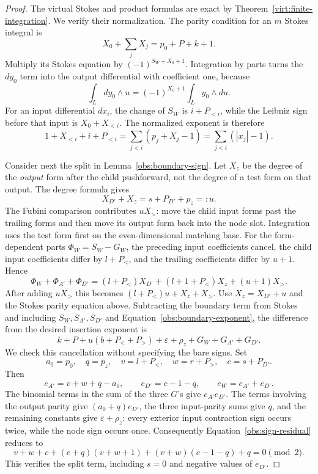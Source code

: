 \documentclass[11pt]{article}
\theoremstyle{definition}
\theoremstyle{remark}
\numberwithin{equation}{section}
\begin{document}
\begin{proof}
The virtual Stokes and product formulas are exact by
Theorem~\ref{virt:finite-integration}.  We verify their normalization.
The parity condition for an $m$ Stokes integral is
\[
 X_0+\sum_jX_j=p_0+P+k+1.
\]
Multiply its Stokes equation by $(-1)^{S_W+X_0+1}$.
Integration by parts turns the $dy_0$ term into the output
differential with coefficient one, because
\[
 \int_Ldy_0\wedge u=(-1)^{X_0+1}\int_Ly_0\wedge du.
\]
For an input differential $dx_i$, the change of $S_W$ is
$i+P_{<i}$, while the Leibniz sign before that input is
$X_0+X_{<i}$.  The normalized exponent is therefore
\[
 1+X_{<i}+i+P_{<i}
 =\sum_{j<i}(p_j+X_j-1)
 =\sum_{j<i}(|x_j|-1).
\]

Consider next the split in Lemma~\ref{obs:boundary-sign}.  Let
$X_z$ be the degree of the \emph{output} form after the child
pushforward, not the degree of a test form on that output.  The
degree formula gives
\[
 X_{D'}+X_z=s+P_{D'}+p_z=:u.
\]
The Fubini comparison contributes $uX_>$: move the child input
forms past the trailing forms and then move its output form back
into the node slot.  Integration uses the test form first on the
even-dimensional matching base.  For the form-dependent parts
$\Phi_W=S_W-G_W$, the preceding input coefficients cancel,
the child input coefficients differ by $l+P_<$, and the
trailing coefficients differ by $u+1$.  Hence
\[
 \Phi_W+\Phi_{A'}+\Phi_{D'}
 =(l+P_<)X_{D'}+(l+1+P_<)X_z+(u+1)X_>.
\]
After adding $uX_>$ this becomes
$(l+P_<)u+X_z+X_>$.  Use
$X_z=X_{D'}+u$ and the Stokes parity equation above.
Subtracting the boundary term
from Stokes and including $S_W,S_{A'},S_{D'}$ and
Equation~\eqref{obs:boundary-exponent}, the difference from the
desired insertion exponent is
\begin{equation}
 \label{obs:sign-residual}
 k+P+u(b+P_<+P_>)+\varepsilon+\rho_z
          +G_W+G_{A'}+G_{D'}.
\end{equation}
We check this cancellation without specifying the bare signs.
Set
\[
 a_0=p_0,\quad q=p_z,\quad
 v=l+P_<,\quad w=r+P_>,\quad c=s+P_{D'}.
\]
Then
\[
 e_{A'}=v+w+q-a_0,\qquad e_{D'}=c-1-q,
 \qquad e_W=e_{A'}+e_{D'}.
\]
The binomial terms in the sum of the three $G$'s give
$e_{A'}e_{D'}$.  The terms involving the output parity give
$(a_0+q)e_{D'}$, the three input-parity sums give $q$, and the
remaining constants give $\varepsilon+\rho_z$: every exterior
input contraction sign occurs twice, while the node sign occurs
once.  Consequently Equation~\eqref{obs:sign-residual} reduces to
\[
 v+w+c+(c+q)(v+w+1)+(v+w)(c-1-q)+q=0
 \pmod2.
\]
This verifies the split term, including $s=0$ and negative values
of $e_{D'}$.


\end{proof}
\end{document}
